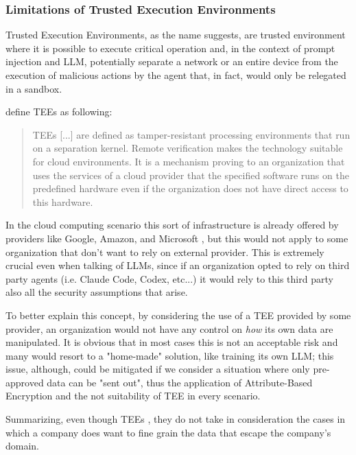 \subsubsection{Limitations of Trusted Execution Environments}
Trusted Execution Environments, as the name suggests, are trusted environment where it is possible to execute critical operation and, in the context of prompt injection and LLM, potentially separate a network or an entire device from the execution of malicious actions by the agent that, in fact, would only be relegated in a sandbox.

\citeauthor{geppert2022trusted} define TEEs as following:
\begin{quote}
    TEEs [...] are defined as tamper-resistant processing environments that run on a separation kernel.
    Remote verification makes the technology suitable for cloud
    environments. It is a mechanism proving to
    an organization that uses the services of a cloud provider that the
    specified software runs on the predefined hardware even if the
    organization does not have direct access to this hardware.
\end{quote}

In the cloud computing scenario this sort of infrastructure is already offered by providers like Google, Amazon, and Microsoft \cite{geppert2022trusted}, but this would not apply to some organization that don't want to rely on external provider. This is extremely crucial even when talking of LLMs, since if an organization opted to rely on third party agents (i.e. Claude Code, Codex, etc...) it would rely to this third party also all the security assumptions that arise.

To better explain this concept, by considering the use of a TEE provided by some provider, an organization would not have any control on \textit{how} its own data are manipulated. It is obvious that in most cases this is not an acceptable risk and many would resort to a "home-made" solution, like training its own LLM; this issue, although, could be mitigated if we consider a situation where only pre-approved data can be "sent out", thus the application of Attribute-Based Encryption and the not suitability of TEE in every scenario.

Summarizing, even though TEEs , they do not take in consideration the cases in which a company does want to fine grain the data that escape the company's domain.

